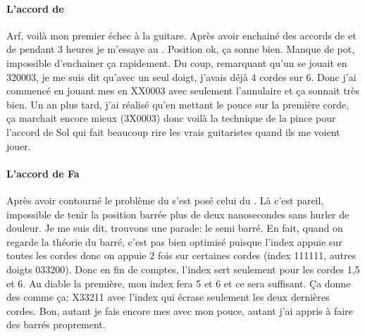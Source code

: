 \documentclass[versionenligne]{patacrep}
\begin{document}
\paragraph{L'accord de }
Arf, voilà mon premier échec à la guitare. Après avoir enchainé des
accords de  et de  pendant 3 heures je
m'essaye au . Position ok, ça sonne bien. Manque de pot,
impossible d'enchainer ça rapidement.  Du coup, remarquant qu'un
 se jouait en 320003, je me suis dit qu'avec un seul
doigt, j'avais déjà 4 cordes sur 6. Donc j'ai commencé en jouant mes
 en XX0003 avec seulement l'annulaire et ça sonnait très
bien. Un an plus tard, j'ai réalisé qu'en mettant le pouce sur la
première corde, ça marchait encore mieux (3X0003) donc voilà la
technique de la pince pour l'accord de Sol qui fait beaucoup rire les
vrais guitaristes quand ils me voient jouer.

\paragraph{L'accord de Fa}
Après avoir contourné le problème du  s'est posé celui du
. Là c'est pareil, impossible de tenir la position barrée
plus de deux nanosecondes sans hurler de douleur.  Je me suis dit,
trouvons une parade: le semi barré.  En fait, quand on regarde la
théorie du barré, c'est pas bien optimisé puisque l'index appuie sur
toutes les cordes donc on appuie 2 fois sur certaines cordes (index
111111, autres doigts 033200). Donc en fin de comptes, l'index sert
seulement pour les cordes 1,5 et 6. Au diable la première, mon index
fera 5 et 6 et ce sera suffisant.  Ça donne des  comme ça: X33211
avec l'index qui écrase seulement les deux dernières cordes. Bon,
autant je fais encore mes  avec mon pouce, autant j'ai appris à
faire des barrés proprement.
\end{document}
